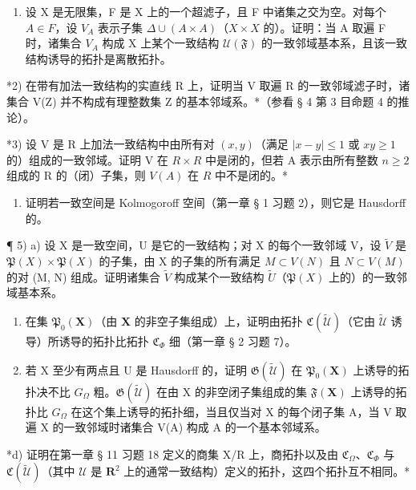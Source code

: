 \BourbakiExerciseGroup

\begin{enumerate}
\def\labelenumi{\arabic{enumi})}
\tightlist
\item
  设 X 是无限集，F 是 X 上的一个超滤子，且 F 中诸集之交为空。对每个 \(A \in F\)，设 \(V_{A}\) 表示子集 \(\Delta \cup (A \times A)\)（\(X \times X\) 的）。证明：当 A 取遍 F 时，诸集合 \(V_{A}\) 构成 X 上某个一致结构 \(\mathcal{U}(\mathfrak{F})\) 的一致邻域基本系，且该一致结构诱导的拓扑是离散拓扑。
\end{enumerate}

*2) 在带有加法一致结构的实直线 R 上，证明当 V 取遍 R 的一致邻域滤子时，诸集合 V(Z) 并不构成有理整数集 Z 的基本邻域系。*（参看 § 4 第 3 目命题 4 的推论）。

*3) 设 V 是 R 上加法一致结构中由所有对 \((x, y)\)（满足 \(|x - y| \leqslant 1\) 或 \(xy \geqslant 1\) 的）组成的一致邻域。证明 V 在 \(R \times R\) 中是闭的，但若 A 表示由所有整数 \(n \geqslant 2\) 组成的 R 的（闭）子集，则 \(V(A)\) 在 \(R\) 中不是闭的。*

\begin{enumerate}
\def\labelenumi{\arabic{enumi})}
\setcounter{enumi}{3}
\tightlist
\item
  证明若一致空间是 Kolmogoroff 空间（第一章 § 1 习题 2），则它是 Hausdorff 的。
\end{enumerate}

¶ 5) a) 设 X 是一致空间，U 是它的一致结构；对 X 的每个一致邻域 V，设 \(\tilde{V}\) 是 \(\mathfrak{P}(X) \times \mathfrak{P}(X)\) 的子集，由 X 的子集的所有满足 \(M \subset V(N)\) 且 \(N \subset V(M)\) 的对 (M, N) 组成。证明诸集合 \(\tilde{V}\) 构成某个一致结构 \(\tilde{U}\)（\(\mathfrak{P}(X)\) 上的）的一致邻域基本系。

\begin{enumerate}
\def\labelenumi{\alph{enumi})}
\setcounter{enumi}{1}
\item
  在集 \(\mathfrak{P}_{0}(\mathbf{X})\)（由 \(\mathbf{X}\) 的非空子集组成）上，证明由拓扑 \(\mathfrak{C}(\tilde{\mathcal{U}})\)（它由 \(\tilde{\mathcal{U}}\) 诱导）所诱导的拓扑比拓扑 \(\mathfrak{C}_{\Phi}\) 细（第一章 § 2 习题 7）。
\item
  若 X 至少有两点且 U 是 Hausdorff 的，证明 \(\mathfrak{G}(\tilde{\mathcal{U}})\) 在 \(\mathfrak{P}_{0}(\mathbf{X})\) 上诱导的拓扑决不比 \(G_{\Omega}\) 粗。\(\mathfrak{G}(\tilde{\mathcal{U}})\) 在由 X 的非空闭子集组成的集 \(\mathfrak{F}(\mathbf{X})\) 上诱导的拓扑比 \(G_{\Omega}\) 在这个集上诱导的拓扑细，当且仅当对 X 的每个闭子集 A，当 V 取遍 X 的一致邻域时诸集合 V(A) 构成 A 的一个基本邻域系。
\end{enumerate}

*d) 证明在第一章 § 11 习题 18 定义的商集 X/R 上，商拓扑以及由 \(\mathfrak{C}_{\Omega}\)、\(\mathfrak{C}_{\Phi}\) 与 \(\mathfrak{C}(\tilde{\mathcal{U}})\)（其中 \(\mathcal{U}\) 是 \(\mathbf{R}^2\) 上的通常一致结构）定义的拓扑，这四个拓扑互不相同。*

